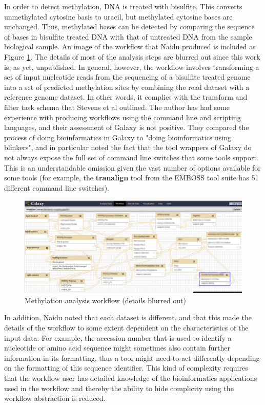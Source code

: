 \documentclass[a4paper,10pt]{scrreprt} \usepackage[utf8]{inputenc}
\begin{document}
In order to detect methylation, DNA is treated with bisulfite. This converts unmethylated cytosine basis to uracil, but methylated cytosine bases are unchanged. Thus, methylated bases can be detected by comparing the sequence of bases in bisulfite treated DNA with that of untreated DNA from the sample biological sample. An image of the workflow that Naidu produced is included as Figure \ref{fig:canvasworkflow_blurred}. The details of most of the analysis steps are blurred out since this work is, as yet, unpublished. In general, however, the workflow involves transforming a set of input nucleotide reads from the sequencing of a bisulfite treated genome into a set of predicted methylation sites by combining the read dataset with a reference genome dataset. In other words, it complies with the transform and filter task schema that Stevens et al outlined. The author has had some experience with producing workflows using the command line and scripting languages, and their assessment of Galaxy is not positive. 
They compared the process of doing bioinformatics in Galaxy to "doing bioinformatics using blinkers", and in particular noted the fact that the tool wrappers of Galaxy do not always expose the full set of command line switches that some tools support. This is an understandable omission given the vast number of options available for some tools (for example, the \textbf{tranalign} tool from the EMBOSS tool suite has 51 different command line switches).

\begin{figure}[hbt]
\centering
\includegraphics[width=\textwidth]{images/canvasworkflow_blurred}
\caption{Methylation analysis workflow (details blurred out)}
\label{fig:canvasworkflow_blurred}
\end{figure}

In addition, Naidu noted that each dataset is different, and that this made the details of the workflow to some extent dependent on the characteristics of the input data. For example, the accession number that is used to identify a nucleotide or amino acid sequence might sometimes also contain further information in its formatting, thus a tool might need to act differently depending on the formatting of this sequence identifier. This kind of complexity requires that the workflow user has detailed knowledge of the bioinformatics applications used in the workflow and thereby the ability to hide complicity using the workflow abstraction is reduced.
\end{document}
